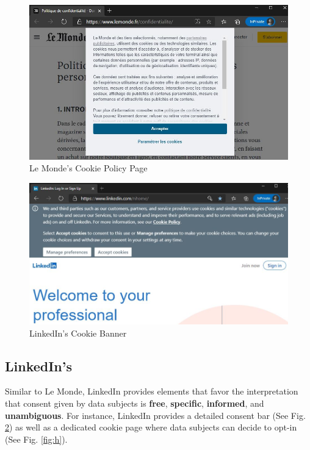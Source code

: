 \documentclass[twocolumn, letterpaper]{scrartcl}
\begin{document}
        \begin{figure}[tbp]	
            \includegraphics[width=0.95\linewidth]{lm_policy.JPG}
            \caption{Le Monde's Cookie Policy Page\label{fig:f}}
        \end{figure}
        
        \begin{figure}[tbp]	
        \includegraphics[width=0.95\linewidth]{ld_website.JPG}
        \caption{LinkedIn's Cookie Banner \label{fig:g}}
        \end{figure}
        
	\subsection*{LinkedIn's}
	    
	    Similar to Le Monde, LinkedIn provides elements that favor the interpretation that consent given by data subjects is \textbf{free}, \textbf{specific}, \textbf{informed}, and \textbf{unambiguous}. For instance, LinkedIn provides a detailed consent bar (See Fig. \ref{fig:g}) as well as a dedicated cookie page where data subjects can decide to opt-in (See Fig. \ref{fig:h}).
        
\end{document}
